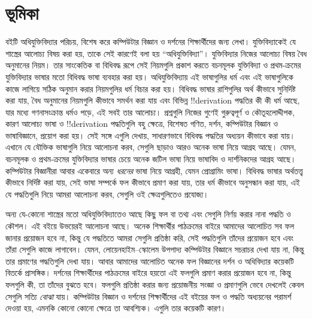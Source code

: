 \chapter{ভূমিকা}

বইটি অধিযুক্তিবিদ্যার পরিচয়, বিশেষ করে কম্পিউটার বিজ্ঞান ও দর্শনের
শিক্ষার্থীদের জন্য লেখা। যুক্তিবিদ্যাকেই যে শাস্ত্রের আলোচ্য বিষয় করা
হয়, তাকে সেই কারণেই বলা হয় ``অধিযুক্তিবিদ্যা''। যুক্তিবিদ্যার নিজের
আলোচ্য বিষয় বৈধ অনুমানের নিয়ম। তার সাংকেতিক বা বিধিবদ্ধ রূপে সেই
নিয়মগুলি প্রকাশ করতে বচনমূলক যুক্তিবিদ্যা ও প্রথম-ক্রমের যুক্তিবিদ্যার
ভাষার মতো বিধিবদ্ধ ভাষা ব্যবহার করা হয়। অধিযুক্তিবিদ্যায় এই ভাষাগুলির
ধর্ম এবং এই ভাষাগুলিকে কাজে লাগিয়ে সঠিক অনুমান করার নিয়মগুলির ধর্ম
বিচার করা হয়। বিধিবদ্ধ ভাষার রাশিগুলির অর্থ কীভাবে সুনির্দিষ্ট করা
যায়, বৈধ অনুমানের নিয়মগুলি কীভাবে সমর্থন করা যায় এবং বিভিন্ন
!!{derivation} পদ্ধতির কী কী ধর্ম আছে, যার মধ্যে গণনাসংক্রান্ত ধর্মও
পড়ে, এই সবই তার আলোচ্য। প্রশ্নগুলি নিজের গুণেই গুরুত্বপূর্ণ ও
কৌতূহলোদ্দীপক, কারণ আলোচ্য ভাষা ও !!{derivation} পদ্ধতিগুলি বহু
ক্ষেত্রে, বিশেষত গণিত, দর্শন, কম্পিউটার বিজ্ঞান ও ভাষাবিজ্ঞানে,
প্রয়োগ করা হয়। সেই সঙ্গে এগুলি দেখায়, সাধারণভাবে বিধিবদ্ধ পদ্ধতির
অধ্যয়ন কীভাবে করা যায়। এখানে যে যৌক্তিক ভাষাগুলি নিয়ে আলোচনা করব,
সেগুলি ছাড়াও আরও অনেক ভাষা নিয়ে আগ্রহ আছে। যেমন, বচনমূলক ও
প্রথম-ক্রমের যুক্তিবিদ্যার ভাষার চেয়ে অনেক জটিল ভাষা নিয়ে
ভাষাবিদ ও দার্শনিকদের আগ্রহ আছে। কম্পিউটার বিজ্ঞানীরা আবার একেবারে
অন্য \emph{ধরনের} ভাষা নিয়ে আগ্রহী, যেমন প্রোগ্রামিং ভাষা। বিধিবদ্ধ
ভাষার অর্থতত্ত্ব কীভাবে নির্দিষ্ট করা যায়, সেই ভাষা সম্পর্কে ফল কীভাবে
প্রমাণ করা যায়, তার ধর্ম কীভাবে অনুসন্ধান করা যায়, এই যে
পদ্ধতিগুলি নিয়ে আমরা আলোচনা করব, সেগুলি ওই ক্ষেত্রগুলিতেও প্রযোজ্য।

অন্য যে-কোনো শাস্ত্রের মতো অধিযুক্তিবিদ্যাতেও আছে কিছু
ফল বা তথ্য এবং সেগুলি নির্ণয় করার নানা পদ্ধতি ও কৌশল। এই বইয়ে
উভয়েরই আলোচনা আছে। অনেক শিক্ষার্থীর পাঠক্রমের বাইরে আমাদের
আলোচিত সব ফল জানার প্রয়োজন হবে না, কিন্তু যে পদ্ধতিতে আমরা
সেগুলি প্রতিষ্ঠা করি, সেই পদ্ধতিগুলি তাঁদের প্রয়োজন হবে এবং তাঁরা
সেগুলি কাজে লাগাবেন। যেমন, লোয়েনহাইম--স্কোলেম উপপাদ্য কম্পিউটার
বিজ্ঞানে সচরাচর দেখা যায় না, কিন্তু তার প্রমাণের পদ্ধতিগুলি দেখা
যায়। আবার আমাদের আলোচিত অনেক ফল বিজ্ঞানের দর্শন ও অধিবিদ্যার
কয়েকটি বিতর্কে প্রাসঙ্গিক। দর্শনের শিক্ষার্থীদের পাঠক্রমের বাইরে
হয়তো এই ফলগুলি প্রমাণ করার প্রয়োজন হবে না, কিন্তু ফলগুলি কী, তা
তাঁদের বুঝতে হবে। ফলগুলি প্রতিষ্ঠা করার জন্য প্রয়োজনীয় সংজ্ঞা ও
প্রমাণগুলি ভেবে দেখলেই কেবল সেগুলি সত্যি \emph{বোঝা} যায়। কম্পিউটার
বিজ্ঞান ও দর্শনের শিক্ষার্থীদের এই বইয়ের ফল ও পদ্ধতি অধ্যয়নের
পরামর্শ দেওয়া হয়, এমনকি কোনো কোনো ক্ষেত্রে তা আবশ্যিক।
এগুলি তার কয়েকটি কারণ।

